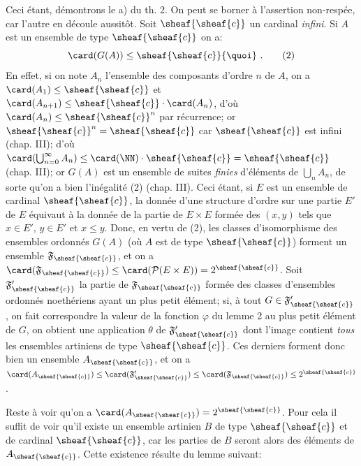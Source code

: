 Ceci \pageoriginale %
étant, démontrons le a) du th. 2. On peut se borner à l'assertion
non-respée, car l'autre en découle aussitôt. Soit
$\sheaf{\sheaf{c}}$ un cardinal \emph{infini}. Si $A$ est un
ensemble de type $\sheaf{\sheaf{c}}$ on a:
\begin{equation}
\card(G(A))\leq \sheaf{\sheaf{c}}{\quoi}%
\ .\tag{2}
\end{equation}
En effet, si on note $A_n$ l'ensemble des composants d'ordre $n$ de
$A$, on a $\card(A_1)\leq \sheaf{\sheaf{c}}$ et $\card(A_{n+1})\leq
\sheaf{\sheaf{c}}\cdot \card(A_n)$, d'où $\card(A_n)\leq
\sheaf{\sheaf{c}}^n$ par récurrence; or
$\sheaf{\sheaf{c}}^n=\sheaf{\sheaf{c}}$ car $\sheaf{\sheaf{c}}$ est
infini (chap. III); d'où $\card(\bigcup^\infty_{n=0} A_n)\leq
\card(\NN)\cdot \sheaf{\sheaf{c}}=\sheaf{\sheaf{c}}$ (chap. III); or
$G(A)$ est un ensemble de suites \emph{finies} d'éléments de
$\bigcup_n A_n$, de sorte qu'on a bien l'inégalité (2) (chap. III).
Ceci étant, si $E$ est un ensemble de cardinal $\sheaf{\sheaf{c}}$,
la donnée d'une structure d'ordre sur une partie $E'$ de $E$
équivaut à la donnée de la partie de $E\times E$ formée des $(x,y)$
tels que $x\in E'$, $y\in E'$ et $x\leq y$. Donc, en vertu de (2),
les classes d'isomorphisme des ensembles ordonnés $G(A)$ (où $A$ est
de type $\sheaf{\sheaf{c}}$) forment un ensemble
$\mathfrak{F}_{\sheaf{\sheaf{c}}}$, et on a
$\card(\mathfrak{F}_{\sheaf{\sheaf{c}}})\leq
\card(\mathcal{P}(E\times E))=2^{\sheaf{\sheaf{c}}}$. Soit
$\mathfrak{F}'_{\sheaf{\sheaf{c}}}$ la partie de
$\mathfrak{F}_{\sheaf{\sheaf{c}}}$ formée des classes d'ensembles
ordonnés noethériens ayant un plus petit élément; si, à tout $G\in
\mathfrak{F}'_{\sheaf{\sheaf{c}}}$, on fait correspondre la valeur
de la fonction $\varphi$ du lemme 2 au plus petit élément de $G$, on
obtient une application $\theta$ de
$\mathfrak{F}'_{\sheaf{\sheaf{c}}}$ dont l'image contient
\emph{tous} les ensembles artiniens de type $\sheaf{\sheaf{c}}$. Ces
derniers forment donc bien un ensemble $A_{\sheaf{\sheaf{c}}}$, et
on a $\card(A_{\sheaf{\sheaf{c}}})\leq
\card(\mathfrak{F}'_{\sheaf{\sheaf{c}}})\leq
\card(\mathfrak{F}_{\sheaf{\sheaf{c}}})\leq 2^{\sheaf{\sheaf{c}}}$.

Reste %
\pageoriginale à voir qu'on a
$\card(A_{\sheaf{\sheaf{c}}})=2^{\sheaf{\sheaf{c}}}$. Pour cela il
suffit de voir qu'il existe un ensemble artinien $B$ de type
$\sheaf{\sheaf{c}}$ et de cardinal $\sheaf{\sheaf{c}}$, car les
parties de $B$ seront alors des éléments de $A_{\sheaf{\sheaf{c}}}$.
Cette existence résulte du lemme suivant:


